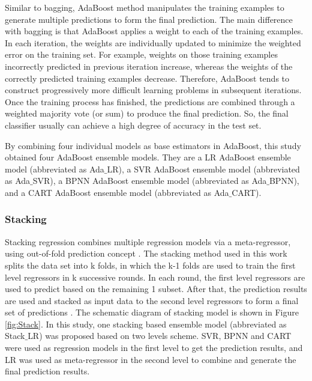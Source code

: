 \documentclass[11pt]{article}
\begin{document}
	
	Similar to bagging, AdaBoost method \cite{freund1996experiments} manipulates the training examples to generate multiple predictions to form the final prediction. The main difference with bagging is that AdaBoost applies a weight to each of the training examples. In each iteration, the weights are individually updated to minimize the weighted error on the training set. For example, weights on those training examples incorrectly predicted in previous iteration increase, whereas the weights of the correctly predicted training examples decrease. Therefore, AdaBoost tends to construct progressively more difficult learning problems in subsequent iterations. Once the training process has finished, the predictions are combined through a weighted majority vote (or sum) to produce the final prediction. So, the final classifier usually can achieve a high degree of accuracy in the test set.
	
By combining four individual models as base estimators in AdaBoost, this study obtained four AdaBoost ensemble models. They are a LR AdaBoost ensemble model (abbreviated as Ada$\_$LR), a SVR AdaBoost ensemble model (abbreviated as Ada$\_$SVR), a BPNN AdaBoost ensemble model (abbreviated as Ada$\_$BPNN), and a CART AdaBoost ensemble model (abbreviated as Ada$\_$CART). 

	
	\subsubsection{Stacking}

	
	Stacking regression combines multiple regression models via a meta-regressor, using out-of-fold prediction concept \cite{raschkas_2018_mlxtend}. The stacking method used in this work splits the data set into k folds, in which the k-1 folds are used to train the first level regressors in k successive rounds. In each round, the first level regressors are used to predict based on the remaining 1 subset. After that, the prediction results are used and stacked as input data to the second level regressors to form a final set of predictions \cite{sill2009feature}. The schematic diagram of stacking model is shown in Figure \ref{fig:Stack}.  In this study, one stacking based ensemble model (abbreviated as Stack$\_$LR) was proposed based on two levels scheme. SVR, BPNN and CART were used as regression models in the first level to get the prediction results, and LR was used as meta-regressor in the second level to combine and generate the final prediction results.
	
\end{document}
